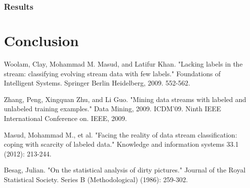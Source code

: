 \documentclass[12pt,a4paper,oneside]{report}
\begin{document}
\subsubsection{Results}
\section{Conclusion}
\begin{thebibliography}{20}

Woolam, Clay, Mohammad M. Masud, and Latifur Khan. "Lacking labels in the stream: classifying evolving stream data with few labels." Foundations of Intelligent Systems. Springer Berlin Heidelberg, 2009. 552-562.

Zhang, Peng, Xingquan Zhu, and Li Guo. "Mining data streams with labeled and unlabeled training examples." Data Mining, 2009. ICDM'09. Ninth IEEE International Conference on. IEEE, 2009.

Masud, Mohammad M., et al. "Facing the reality of data stream classification: coping with scarcity of labeled data." Knowledge and information systems 33.1 (2012): 213-244.

Besag, Julian. "On the statistical analysis of dirty pictures." Journal of the Royal Statistical Society. Series B (Methodological) (1986): 259-302.


\end{thebibliography}
\end{document}
